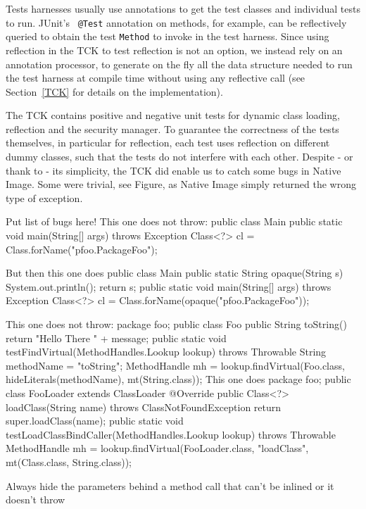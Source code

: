 Tests harnesses usually use annotations to get the test classes and individual tests to run. JUnit's~\cite{noauthor_junit_nodate} \verb|@Test| annotation on methods, for example, can be reflectively queried to obtain the test \verb|Method| to invoke in the test harness.   
Since using reflection in the TCK to test reflection is not an option, we instead rely on an annotation processor, to generate on the fly all the data structure needed to run the test harness at compile time without using any reflective call (see Section~\ref{TCK} for details on the implementation). 

The TCK contains positive and negative unit tests for dynamic class loading, reflection and the security manager. To guarantee the correctness of the tests themselves, in particular for reflection, each test uses reflection on different dummy classes, such that the tests do not interfere with each other.
Despite - or thank to - its simplicity, the TCK did enable us to catch some bugs in Native Image.
Some were trivial, see Figure, as Native Image simply returned the wrong type of exception. 

Put list of bugs here!
This one does not throw:
public class Main {
    public static void main(String[] args) throws Exception {
        Class<?> cl = Class.forName("pfoo.PackageFoo");
    }
}

But then this one does
public class Main {
    public static String opaque(String s) {
        System.out.println();
        return s;
    }
    public static void main(String[] args) throws Exception {
        Class<?> cl = Class.forName(opaque("pfoo.PackageFoo"));
    }
}

This one does not throw:
package foo;
public class Foo {
    public String toString() {
        return "Hello There " + message;
    }
}
public static void testFindVirtual(MethodHandles.Lookup lookup) throws Throwable {
    String methodName = "toString";
    MethodHandle mh = lookup.findVirtual(Foo.class, hideLiterals(methodName), mt(String.class));
}
This one does
package foo;
public class FooLoader extends ClassLoader {
    @Override
    public Class<?> loadClass(String name) throws ClassNotFoundException {
        return super.loadClass(name);
    }
}
public static void testLoadClassBindCaller(MethodHandles.Lookup lookup) throws Throwable {
    MethodHandle mh = lookup.findVirtual(FooLoader.class, "loadClass", mt(Class.class, String.class));
}

Always hide the parameters behind a method call that can't be inlined or it doesn't throw



